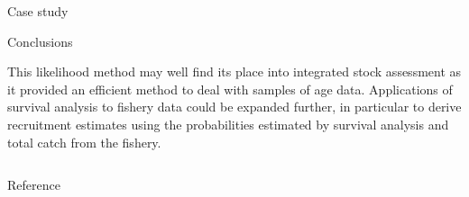 \documentclass[final]{beamer}
\begin{document}
\begin{frame}{}
\begin{columns}[t]
\begin{column}{.47\linewidth}
\begin{block}{Case study}
      \end{block}

      \begin{block}{Conclusions}

        This likelihood method may well find its place into integrated stock assessment as it provided an efficient method to deal with samples of age data. Applications of survival analysis to fishery data could be expanded further, in particular to derive recruitment estimates using the probabilities estimated by survival analysis and total catch from the fishery.

      \end{block}

      \end{column}


  \end{columns}

  
  \begin{block}{Reference}
%    
    
    
    \nocite{Kienzle2015} %
  \end{block}
  
\end{frame}
\end{document}
